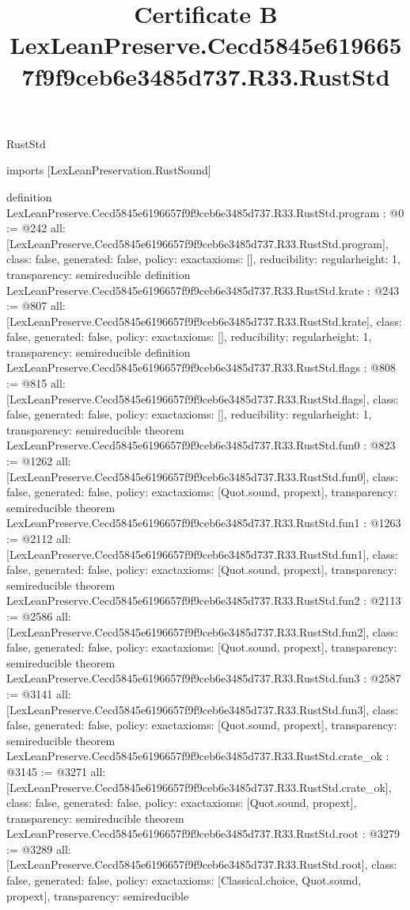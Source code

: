 \begin{lexlean}{RustStd}
\title{Certificate B LexLeanPreserve.Cecd5845e6196657f9f9ceb6e3485d737.R33.RustStd}
\begin{coremodule}
imports [LexLeanPreservation.RustSound]

definition LexLeanPreserve.Cecd5845e6196657f9f9ceb6e3485d737.R33.RustStd.program : @0 := @242 {
  all: [LexLeanPreserve.Cecd5845e6196657f9f9ceb6e3485d737.R33.RustStd.program],
  class: false,
  generated: false,
  policy: exact{axioms: []},
  reducibility: regular{height: 1},
  transparency: semireducible
}
definition LexLeanPreserve.Cecd5845e6196657f9f9ceb6e3485d737.R33.RustStd.krate : @243 := @807 {
  all: [LexLeanPreserve.Cecd5845e6196657f9f9ceb6e3485d737.R33.RustStd.krate],
  class: false,
  generated: false,
  policy: exact{axioms: []},
  reducibility: regular{height: 1},
  transparency: semireducible
}
definition LexLeanPreserve.Cecd5845e6196657f9f9ceb6e3485d737.R33.RustStd.flags : @808 := @815 {
  all: [LexLeanPreserve.Cecd5845e6196657f9f9ceb6e3485d737.R33.RustStd.flags],
  class: false,
  generated: false,
  policy: exact{axioms: []},
  reducibility: regular{height: 1},
  transparency: semireducible
}
theorem LexLeanPreserve.Cecd5845e6196657f9f9ceb6e3485d737.R33.RustStd.fun0 : @823 := @1262 {
  all: [LexLeanPreserve.Cecd5845e6196657f9f9ceb6e3485d737.R33.RustStd.fun0],
  class: false,
  generated: false,
  policy: exact{axioms: [Quot.sound, propext]},
  transparency: semireducible
}
theorem LexLeanPreserve.Cecd5845e6196657f9f9ceb6e3485d737.R33.RustStd.fun1 : @1263 := @2112 {
  all: [LexLeanPreserve.Cecd5845e6196657f9f9ceb6e3485d737.R33.RustStd.fun1],
  class: false,
  generated: false,
  policy: exact{axioms: [Quot.sound, propext]},
  transparency: semireducible
}
theorem LexLeanPreserve.Cecd5845e6196657f9f9ceb6e3485d737.R33.RustStd.fun2 : @2113 := @2586 {
  all: [LexLeanPreserve.Cecd5845e6196657f9f9ceb6e3485d737.R33.RustStd.fun2],
  class: false,
  generated: false,
  policy: exact{axioms: [Quot.sound, propext]},
  transparency: semireducible
}
theorem LexLeanPreserve.Cecd5845e6196657f9f9ceb6e3485d737.R33.RustStd.fun3 : @2587 := @3141 {
  all: [LexLeanPreserve.Cecd5845e6196657f9f9ceb6e3485d737.R33.RustStd.fun3],
  class: false,
  generated: false,
  policy: exact{axioms: [Quot.sound, propext]},
  transparency: semireducible
}
theorem LexLeanPreserve.Cecd5845e6196657f9f9ceb6e3485d737.R33.RustStd.crate_ok : @3145 := @3271 {
  all: [LexLeanPreserve.Cecd5845e6196657f9f9ceb6e3485d737.R33.RustStd.crate_ok],
  class: false,
  generated: false,
  policy: exact{axioms: [Quot.sound, propext]},
  transparency: semireducible
}
theorem LexLeanPreserve.Cecd5845e6196657f9f9ceb6e3485d737.R33.RustStd.root : @3279 := @3289 {
  all: [LexLeanPreserve.Cecd5845e6196657f9f9ceb6e3485d737.R33.RustStd.root],
  class: false,
  generated: false,
  policy: exact{axioms: [Classical.choice, Quot.sound, propext]},
  transparency: semireducible
}


\end{coremodule}
\end{lexlean}
